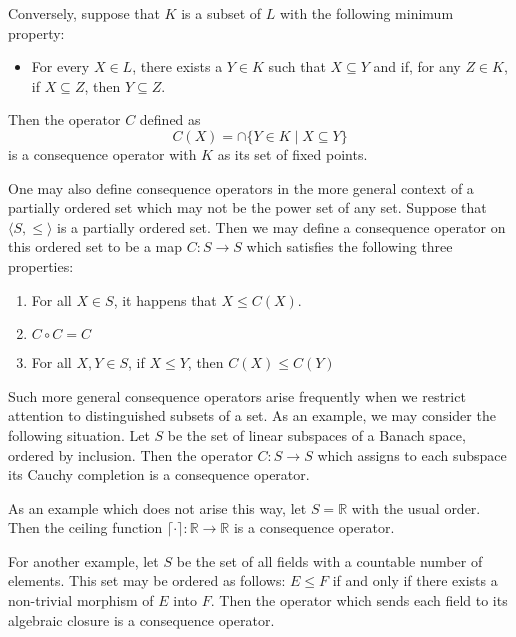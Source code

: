 \documentclass[12pt]{article}
\begin{document}
Conversely, suppose that $K$ is a subset of $L$ with the following minimum property:  
\begin{itemize} \item For every $X \in L$, there exists a $Y \in K$ such 
that $X \subseteq Y$ and if, for any $Z \in K$, if $X \subseteq Z$, then 
$Y \subseteq Z$. \end{itemize}
Then the operator $C$ defined as
 \[C(X) = \cap \{ Y \in K \mid X \subseteq Y \}\]
is a consequence operator with $K$ as its set of fixed points.

One may also define consequence operators in the more general context of
a partially ordered set which may not be the power set of any set.  Suppose
that $\langle S, \le \rangle$ is a partially ordered set.  Then we may define
a consequence operator on this ordered set to be a map $C \colon S \to S$
which satisfies the following three properties:
\begin{enumerate}
\item For all $X \in S$, it happens that $X \le C(X)$.
\item $C \circ C = C$
\item For all $X, Y \in S$, if $X \le Y$, then $C(X) \le C(Y)$
\end{enumerate}

Such more general consequence operators arise frequently when we restrict
attention to distinguished subsets of a set.  As an example, we may consider 
the following situation.  Let $S$ be the set of linear subspaces of a Banach
space, ordered by inclusion.  Then the operator $C \colon S \to S$ which
assigns to each subspace its Cauchy completion is a consequence operator.

As an example which does not arise this way, let $S = \mathbb{R}$ with the
usual order.  Then the ceiling function $\lceil \cdot \rceil \colon
\mathbb{R} \to \mathbb{R}$ is a consequence operator.

For another example, let $S$ be the set of all fields
with a countable number of elements.  This set may be ordered as follows: 
$E \le F$ if and only if there exists a non-trivial morphism of $E$ into $F$.  Then the operator which sends each field to its algebraic closure is a 
consequence operator.
\end{document}
